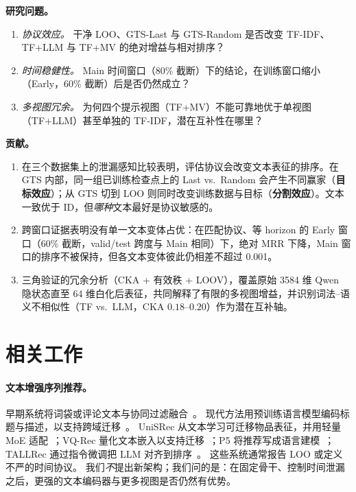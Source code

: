 \documentclass[sigconf,natbib=true,anonymous]{acmart}
\newcommand{\tfidf}{\textsc{TF-IDF}\xspace}
\newcommand{\tfllm}{\textsc{TF+LLM}\xspace}
\newcommand{\tfmv}{\textsc{TF+MV}\xspace}
\begin{document}
\smallskip\noindent\textbf{研究问题。}
\begin{enumerate}[leftmargin=*,itemsep=1pt]
\item[\textbf{RQ1}] \emph{协议效应。}
干净 LOO、GTS-Last 与 GTS-Random 是否改变 \tfidf、\tfllm 与 \tfmv 的绝对增益与相对排序？
\item[\textbf{RQ2}] \emph{时间稳健性。}
Main 时间窗口（$80\%$ 截断）下的结论，在训练窗口缩小（Early，$60\%$ 截断）后是否仍然成立？
\item[\textbf{RQ3}] \emph{多视图冗余。}
为何四个提示视图（\tfmv）不能可靠地优于单视图（\tfllm）甚至单独的 \tfidf，潜在互补性在哪里？
\end{enumerate}

\smallskip\noindent\textbf{贡献。}
\begin{enumerate}[leftmargin=*,itemsep=1pt]
\item 在三个数据集上的泄漏感知比较表明，评估协议会改变文本表征的排序。在 GTS 内部，同一组已训练检查点上的 Last vs.\ Random 会产生不同赢家（\textbf{目标效应}）；从 GTS 切到 LOO 则同时改变训练数据与目标（\textbf{分割效应}）。文本一致优于 ID，但\emph{哪种}文本最好是协议敏感的。
\item 跨窗口证据表明没有单一文本变体占优：在匹配协议、等 horizon 的 Early 窗口（$60\%$ 截断，valid/test 跨度与 Main 相同）下，绝对 MRR 下降，Main 窗口的排序不被保持，但各文本变体彼此仍相差不超过 0.001。
\item 三角验证的冗余分析（CKA + 有效秩 + LOOV），覆盖原始 3584 维 Qwen 隐状态直至 64 维白化后表征，共同解释了有限的多视图增益，并识别词法--语义不相似性（TF vs.\ LLM，CKA $0.18$--$0.20$）作为潜在互补轴。
\end{enumerate}

\section{相关工作}
\label{sec:related}

\paragraph{文本增强序列推荐。}
早期系统将词袋或评论文本与协同过滤融合~\cite{wang2015cdl,salton1988termweighting}。
现代方法用预训练语言模型编码标题与描述，以支持跨域迁移~\cite{hou2022unisrec,hou2023vqrec,geng2022p5,bao2023tallrec}。
UniSRec 从文本学习可迁移物品表征，并用轻量 MoE 适配~\cite{hou2022unisrec}；VQ-Rec 量化文本嵌入以支持迁移~\cite{hou2023vqrec}；P5 将推荐写成语言建模~\cite{geng2022p5}；TALLRec 通过指令微调把 LLM 对齐到排序~\cite{bao2023tallrec}。
这些系统通常报告 LOO 或定义不严的时间协议。
我们\emph{不}提出新架构；我们问的是：在固定骨干、控制时间泄漏之后，更强的文本编码器与更多视图是否仍然有优势。
\end{document}
